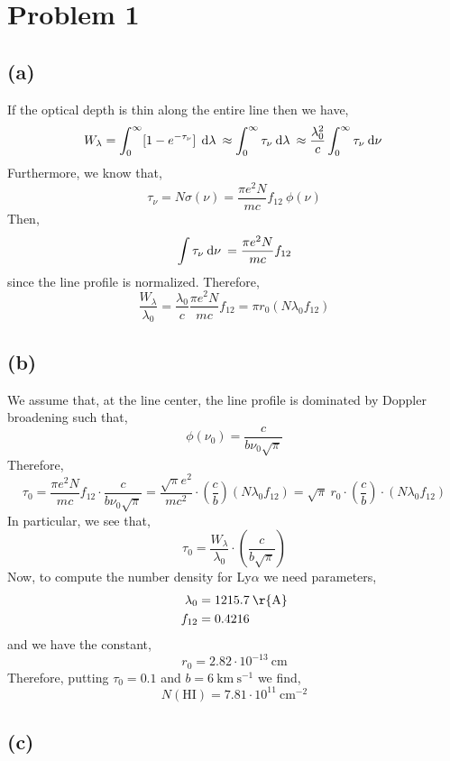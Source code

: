 \documentclass[12pt]{article}
\begin{document}

\section{Problem 1}


\subsection*{(a)}

If the optical depth is thin along the entire line then we have,
\[ W_\lambda = \int_0^\infty [1 - e^{-\tau_\nu}] \: \: \mathrm{d}\lambda \: \approx \int_0^{\infty} \tau_\nu \: \mathrm{d}\lambda \: \approx \frac{\lambda_0^2}{c} \int_0^\infty \tau_\nu \: \mathrm{d}\nu \: \]
Furthermore, we know that,
\[ \tau_\nu = N \sigma(\nu) = \frac{\pi e^2 N}{mc} f_{12} \: \phi(\nu) \]
Then,
\[ \int \tau_\nu \: \mathrm{d}\nu \: = \frac{\pi e^2 N}{mc} f_{12} \]
since the line profile is normalized. Therefore,
\[ \frac{W_\lambda}{\lambda_0} = \frac{\lambda_0}{c} \frac{\pi e^2 N}{mc} f_{12} = \pi r_0 (N \lambda_0 f_{12}) \]

\subsection*{(b)}

We assume that, at the line center, the line profile is dominated by Doppler broadening such that,
\[ \phi(\nu_0) = \frac{c}{b \nu_0 \sqrt{\pi}} \]
Therefore,
\[ \tau_0 = \frac{\pi e^2 N}{m c} f_{12} \cdot \frac{c}{b \nu_0 \sqrt{\pi}} = \frac{\sqrt{\pi} e^2}{mc^2} \cdot \left( \frac{c}{b} \right) (N \lambda_0 f_{12}) = \sqrt{\pi} \: r_0 \cdot \left( \frac{c}{b} \right) \cdot (N \lambda_0 f_{12})  \]
In particular, we see that,
\[ \tau_0 = \frac{W_\lambda}{\lambda_0}  \cdot \left( \frac{c}{b \sqrt{\pi}} \right) \]
Now, to compute the number density for Ly$\alpha$ we need parameters,
\begin{align*}
\lambda_0 & = 1215.7 \: \mathrm{\r{A}} 
\\
f_{12} & = 0.4216
\end{align*}
and we have the constant,
\[ r_0 = 2.82 \cdot 10^{-13} \: \mathrm{cm} \]
Therefore, putting $\tau_0 = 0.1$ and $b = 6 \: \mathrm{km} \: \mathrm{s}^{-1}$ we find,
\[ N(\mathrm{HI}) = 7.81 \cdot 10^{11} \: \mathrm{cm}^{-2} \]

\subsection*{(c)}
\end{document}
